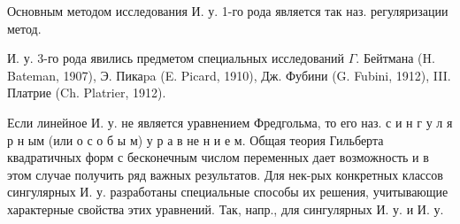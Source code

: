 \documentclass[10pt]{article}
\begin{document}
Основным методом исследования И. у. 1-го рода является так наз. регуляризации метод.



И. у. 3-го рода явились предметом специальных исследований $\Gamma$. Бейтмана (H. Bateman, 1907), Э. Пикаpa (E. Picard, 1910), Дж. Фубини (G. Fubini, 1912), III. Платрие (Ch. Platrier, 1912).



Если линейное И. у. не является уравнением Фредгольма, то его наз. с и н г у л я р н ым (или о с о б ы м) у р а в не н и е м. Общая теория Гильберта квадратичных форм с бесконечным числом переменных дает возможность и в этом случае получить ряд важных результатов. Для нек-рых конкретных классов сингулярных И. у. разработаны специальные способы их решения, учитывающие характерные свойства этих уравнений. Так, напр., для сингулярных И. у. и И. у.
\end{document}
